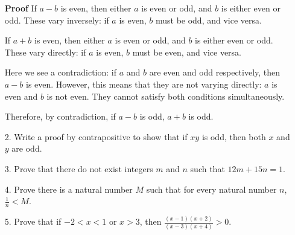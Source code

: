 \documentclass[12pt]{article}
\begin{document}
\begin{enumerate}
  \item[\textbf{Proof}] If $a-b$ is even, then either $a$ is even or odd, and $b$ is either even or odd. These vary inversely: if $a$ is even, $b$ must be odd, and vice versa.
  \item[] If $a+b$ is even, then either $a$ is even or odd, and $b$ is either even or odd. These vary directly: if $a$ is even, $b$ must be even, and vice versa.
  \item[] Here we see a contradiction: if $a$ and $b$ are even and odd respectively, then $a-b$ is even. However, this means that they are not varying directly: $a$ is even and $b$ is not even. They cannot satisfy both conditions simultaneously.
  \item[] Therefore, by contradiction, if $a-b$ is odd, $a+b$ is odd.
\end{enumerate}


\begin{enumerate}
\item[2.] Write a proof by contrapositive to show that if $xy$ is odd, then both $x$ and $y$ are odd.
\end{enumerate}

\begin{enumerate}
\item[3.] Prove that there do not exist integers $m$ and $n$ such that $12m + 15n = 1$.
\end{enumerate}

\begin{enumerate}
\item[4.] Prove there is a natural number $M$  such that for every natural number $n$, $\frac{1}{n} < M$.
\end{enumerate}

\begin{enumerate}
\item[5.] Prove that if $-2 < x < 1$ or $x > 3$, then $\frac{(x-1)(x+2)}{(x-3)(x+4)} > 0.$
\end{enumerate}
\end{document}
